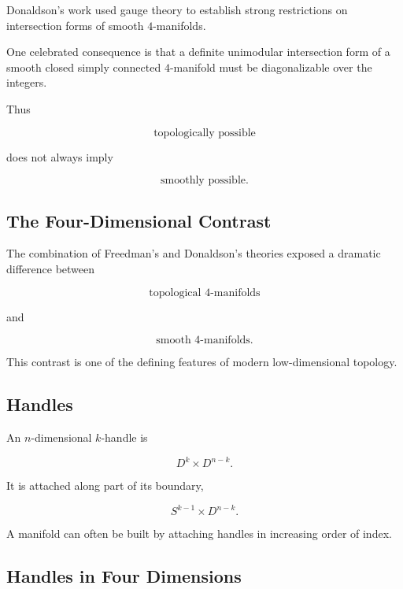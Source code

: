 Donaldson's work used gauge theory to establish strong restrictions on
intersection forms of smooth \(4\)-manifolds.

One celebrated consequence is that a definite unimodular intersection form
of a smooth closed simply connected \(4\)-manifold must be diagonalizable
over the integers.

Thus

\[
\boxed{
\text{topologically possible}
}
\]

does not always imply

\[
\boxed{
\text{smoothly possible}.
}
\]

\subsection{The Four-Dimensional Contrast}
\label{subsec:four-dimensional-contrast}

The combination of Freedman's and Donaldson's theories exposed a dramatic
difference between

\[
\boxed{
\text{topological }4\text{-manifolds}
}
\]

and

\[
\boxed{
\text{smooth }4\text{-manifolds}.
}
\]

This contrast is one of the defining features of modern
low-dimensional topology.

\subsection{Handles}
\label{subsec:handles-low-dimensional}

An \(n\)-dimensional \(k\)-handle is

\[
\boxed{
D^k\times D^{n-k}.
}
\]

It is attached along part of its boundary,

\[
\boxed{
S^{k-1}\times D^{n-k}.
}
\]

A manifold can often be built by attaching handles in increasing order of
index.

\subsection{Handles in Four Dimensions}
\label{subsec:four-dimensional-handles}

